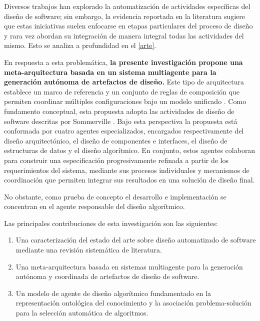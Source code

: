 \documentclass[12pt, letterpaper, oneside]{book}
\begin{document}
Diversos trabajos han explorado la automatización de actividades específicas del diseño de software; sin embargo, la evidencia reportada en la literatura sugiere que estas iniciativas suelen enfocarse en etapas particulares del proceso de diseño y rara vez abordan su integración de manera integral todas las actividades del mismo. Esto se analiza a profundidad en el \cref{arte}.


En respuesta a esta problemática, \textbf{la presente investigación propone una meta-arquitectura basada en un sistema multiagente para la generación autónoma de artefactos de diseño.} Este tipo de arquitectura establece un marco de referencia y un conjunto de reglas de composición que permiten coordinar múltiples configuraciones bajo un modelo unificado \cite{metaarch2005Smeda}. Como fundamento conceptual, esta propuesta adopta las actividades de diseño de software descritas por Sommerville \cite{Sommerville2015-px}.  Bajo esta perspectiva la propuesta está conformada por cuatro agentes especializados, encargados respectivamente del diseño arquitectónico, el diseño de componentes e interfaces, el diseño de estructuras de datos y el diseño algorítmico. En conjunto, estos agentes colaboran para construir una especificación progresivamente refinada a partir de los requerimientos del sistema, mediante sus procesos individuales y mecanismos de coordinación que permiten integrar sus resultados en una solución de diseño final.

No obstante, como prueba de concepto el desarrollo e implementación se concentran en el agente responsable del diseño algorítmico.

Las principales contribuciones de esta investigación son las siguientes: 
\begin{enumerate} 
	\item Una caracterización del estado del arte sobre diseño automatizado de software mediante una revisión sistemática de literatura. 
	\item Una meta-arquitectura basada en sistemas multiagente para la generación autónoma y coordinada de artefactos de diseño de software. 
	\item Un modelo de agente de diseño algorítmico fundamentado en la representación ontológica del conocimiento y la asociación problema-solución para la selección automática de algoritmos.
\end{enumerate}
\end{document}
